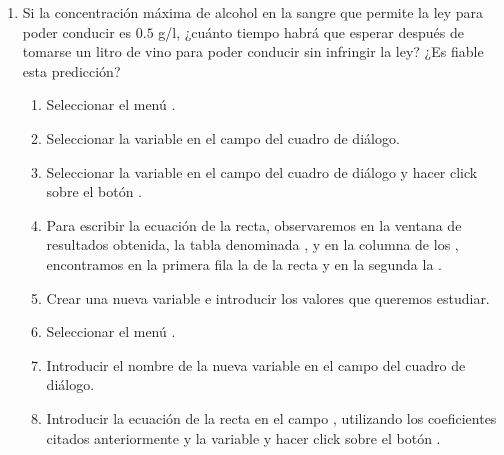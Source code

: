 \begin{enumerate}[leftmargin=*]
\begin{enumerate}
\item  Si la concentración máxima de alcohol en la sangre que permite 
la ley para poder conducir es $0.5$ g/l, ¿cuánto tiempo habrá que 
esperar después de tomarse un litro de vino para poder conducir sin 
infringir la ley? ¿Es fiable esta predicción?
\begin{indicacion}
\begin{enumerate}
\item Seleccionar el menú .
\item Seleccionar la variable  en el campo 
 del cuadro de diálogo.
\item Seleccionar la variable  en el campo 
 del cuadro de diálogo y hacer click
sobre el botón .
\item Para escribir la ecuación de la recta, observaremos en la ventana 
de resultados obtenida, la tabla denominada , y 
en la columna  de los 
, encontramos en la primera 
fila la  de la recta y en la segunda 
la .
\item Crear una nueva variable  e introducir 
los valores que queremos estudiar.
\item Seleccionar el menú .
\item Introducir el nombre de la nueva variable 
 en el campo 
del cuadro de diálogo.
\item Introducir la ecuación de la recta en el campo 
, utilizando los coeficientes citados
anteriormente y la variable  y hacer click 
sobre el botón .
\end{enumerate}
\end{indicacion}
\end{enumerate}

\end{enumerate}


